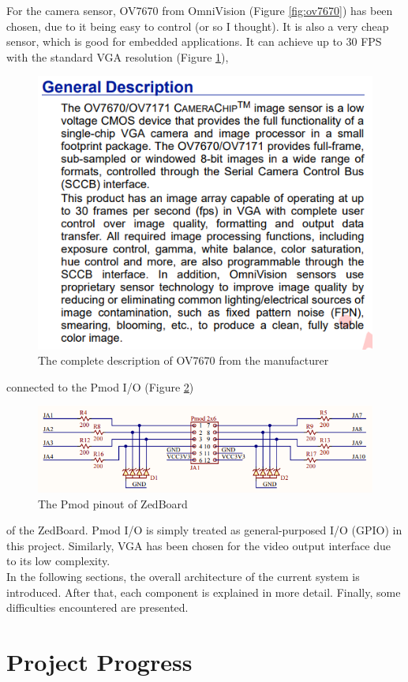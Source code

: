 \documentclass{article}
\begin{document}
	For the camera sensor, OV7670 from OmniVision (Figure \ref{fig:ov7670}) \cite{ovdatasheet} has been chosen, due to it being easy to control (or so I thought). It is also a very cheap sensor, which is good for embedded applications. It can achieve up to 30 FPS with the standard VGA resolution (Figure \ref{fig:officialadv}),
	\begin{figure}[h]
		\centering
		\includegraphics[scale=0.7]{officialadv}
		\caption{The complete description of OV7670 from the manufacturer}
		\label{fig:officialadv}
	\end{figure} connected to the Pmod I/O (Figure \ref{fig:pmod})
	\begin{figure}[h]
		\centering
		\includegraphics[scale=0.87]{pmod}
		\caption{The Pmod pinout of ZedBoard}
		\label{fig:pmod}
	\end{figure} of the ZedBoard. Pmod I/O is simply treated as general-purposed I/O (GPIO) in this project. Similarly, VGA has been chosen for the video output interface due to its low complexity.
	\\
	
	In the following sections, the overall architecture of the current system is introduced. After that, each component is explained in more detail. Finally, some difficulties encountered are presented.
	\newpage\phantom{blabla}
	\newpage\section{Project Progress}
	
\end{document}
